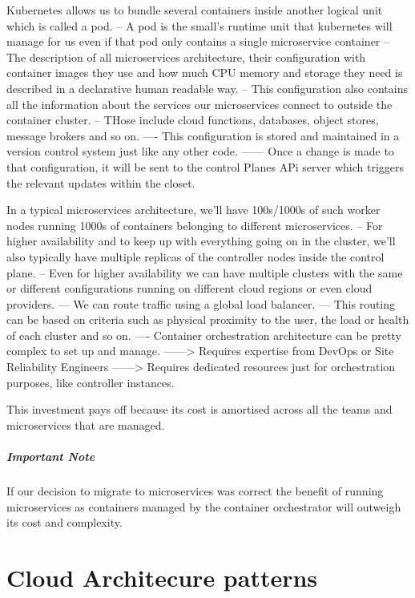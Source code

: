 \documentclass[a4paper, 11pt]{book}
\begin{document}
    Kubernetes allows us to bundle several containers inside another logical unit which is called a pod.
    -- A pod is the small's runtime unit that kubernetes will manage for us even if that pod only contains a single microservice container
    -- The description of all microservices architecture, their configuration with container images they use and how much CPU memory and storage they need is described in a declarative human readable way.
    -- This configuration also contains all the information about the services our microservices connect to outside the container cluster.
    -- THose include cloud functions, databases, object stores, message brokers and so on.
    ---- This configuration is stored and maintained in a version control system just like any other code.
    ------ Once a change is made to that configuration, it will be sent to the control Planes APi server which triggers the relevant updates within the closet.

    In a typical microservices architecture, we'll have 100s/1000s of such worker nodes running 1000s of containers belonging to different microservices.
    -- For higher availability and to keep up with everything going on in the cluster, we'll also typically have multiple replicas of the controller nodes inside the control plane.
    -- Even for higher availability we can have multiple clusters with the same or different configurations running on different cloud regions or even cloud providers.
    --- We can route traffic using a global load balancer.
    --- This routing can be based on criteria such as physical proximity to the user, the load or health of each cluster and so on.
    ---- Container orchestration architecture can be pretty complex to set up and manage.
    ------> Requires expertise from DevOps or Site Reliability Engineers
    ------> Requires dedicated resources just for orchestration purposes, like controller instances.

    This investment pays off because its cost is amortised across all the teams and microservices that are managed.

    \paragraph{Important Note}
    If our decision to migrate to microservices was correct the benefit of running microservices as containers managed by the container orchestrator will outweigh its cost and complexity.

    \chapter{Cloud Architecure patterns}
\end{document}
